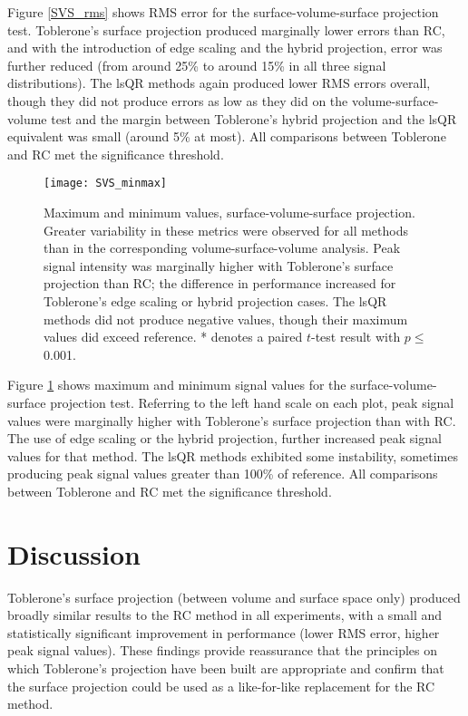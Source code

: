 Figure \ref{SVS_rms} shows RMS error for the surface-volume-surface projection test. Toblerone's surface projection produced marginally lower errors than RC, and with the introduction of edge scaling and the hybrid projection, error was further reduced (from around 25\% to around 15\% in all three signal distributions). The lsQR methods again produced lower RMS errors overall, though they did not produce errors as low as they did on the volume-surface-volume test and the margin between Toblerone's hybrid projection and the lsQR equivalent was small (around 5\% at most). All comparisons  between Toblerone and RC met the significance threshold. 

\begin{figure}[H]
\centering
\texttt{[image: SVS\_minmax]}
\caption{Maximum and minimum values, surface-volume-surface projection. Greater variability in these metrics were observed for all methods than in the corresponding volume-surface-volume analysis. Peak signal intensity was marginally higher with Toblerone's surface projection than RC; the difference in performance increased for Toblerone's edge scaling or hybrid projection cases. The lsQR methods did not produce negative values, though their maximum values did exceed reference. * denotes a paired $t$-test result with $p\leq $ 0.001.}
\label{SVS_minmax} 
\end{figure}

Figure \ref{SVS_minmax} shows maximum and minimum signal values for the surface-volume-surface projection test. Referring to the left hand scale on each plot, peak signal values were marginally higher with Toblerone's surface projection than with RC. The use of edge scaling or the hybrid projection, further increased peak signal values for that method. The lsQR methods exhibited some instability, sometimes producing peak signal values greater than 100\% of reference. All comparisons  between Toblerone and RC met the significance threshold. 

\section{Discussion}
Toblerone's surface projection (between volume and surface space only) produced broadly similar results to the RC method in all experiments, with a small and statistically significant improvement in performance (lower RMS error, higher peak signal values). These findings provide reassurance that the principles on which Toblerone's projection have been built are appropriate and confirm that the surface projection could be used as a like-for-like replacement for the RC method. 

